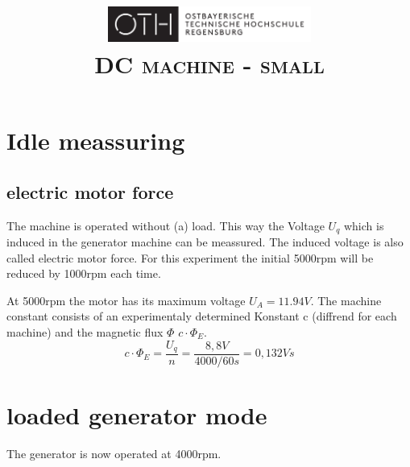 \documentclass[conference]{IEEEtran}
\author{
    \IEEEauthorblockN{
        \textsc{Ayham Alhalaibi}
    }
    \and
    \IEEEauthorblockN{
        \textsc{Julia Blechle}
    }
    \and
    \IEEEauthorblockN{
        \textsc{Clara Huber}
    }
}
\begin{document}
\title{
    \centering
    \includegraphics[width=0.5\textwidth]{../OTHR_OTHR_Logo.pdf}\\
    \textsc{DC machine - small} \\
}

\maketitle

\begin{abstract}

\end{abstract}

\section{Idle meassuring}
\subsection{electric motor force}
The machine is operated without (a) load. This way the Voltage $U_q$ which is induced in the generator machine can be meassured.
The induced voltage is also called electric motor force. For this experiment the initial 5000rpm will be reduced by 1000rpm each time.

At 5000rpm the motor has its maximum voltage $U_A = 11.94V$. The machine constant consists of an experimentaly determined Konstant c (diffrend for each machine) and the magnetic flux $\Phi$ $ c \cdot \Phi_E$.\\

\begin{equation}
    c \cdot \Phi_E = \frac{U_q}{n} = \frac{8,8V}{4000/60s} = 0,132Vs
\end{equation}

\section{loaded generator mode}
The generator is now operated at 4000rpm. 
\end{document}
